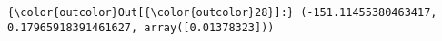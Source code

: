 \documentclass[11pt]{article}
\begin{document}
\begin{Verbatim}[commandchars=\\\{\}]
{\color{outcolor}Out[{\color{outcolor}28}]:} (-151.11455380463417, 0.17965918391461627, array([0.01378323]))
\end{Verbatim}
            
    \begin{center}
    \end{center}
    { \hspace*{\fill} \\}
    

    
    
    
    
\end{document}
